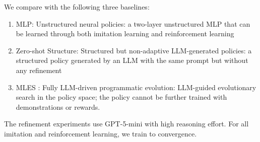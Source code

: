 We compare with the following three baselines:
\begingroup
\setlength{\leftmargini}{1.5em}
\begin{enumerate}
    \item MLP: Unstructured neural policies: a two-layer unstructured MLP that can be learned through both imitation learning and reinforcement learning
    \item Zero-shot Structure: Structured but non-adaptive LLM-generated policies: a structured policy generated by an LLM with the same prompt but without any refinement
    \item MLES \cite{hu2025multimodal}: Fully LLM-driven programmatic evolution: LLM-guided evolutionary search in the policy space; the policy cannot be further trained with demonstrations or rewards.
\end{enumerate}
\endgroup
The refinement experiments use GPT-5-mini with high reasoning effort.
For all imitation and reinforcement learning, we train to convergence.




